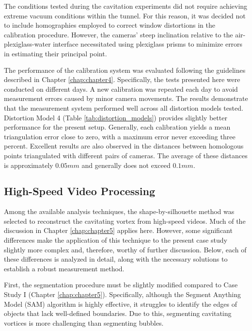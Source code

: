 The conditions tested during the cavitation experiments did not require achieving extreme vacuum conditions within the tunnel. For this reason, it was decided not to include homographies employed to correct window distortions in the calibration procedure.
However, the cameras' steep inclination relative to the air-plexiglass-water interface necessitated using plexiglass prisms to minimize errors in estimating their principal point.

The performance of the calibration system was evaluated following the guidelines described in Chapter \ref{chap:chapter4}. Specifically, the tests presented here were conducted on different days. A new calibration was repeated each day to avoid measurement errors caused by minor camera movements.
The results demonstrate that the measurement system performed well across all distortion models tested. Distortion Model 4 (Table \ref{tab:distortion_models}) provides slightly better performance for the present setup.
Generally, each calibration yields a mean triangulation error close to zero, with a maximum error never exceeding three percent. Excellent results are also observed in the distances between homologous points triangulated with different pairs of cameras. The average of these distances is approximately $0.05 mm$ and generally does not exceed $0.1 mm$.

\subsection{High-Speed Video Processing}
\label{sez:CVProc2}

Among the available analysis techniques, the shape-by-silhouette method was selected to reconstruct the cavitating vortex from high-speed videos.
Much of the discussion in Chapter \ref{chap:chapter5} applies here. However, some significant differences make the application of this technique to the present case study slightly more complex and, therefore, worthy of further discussion.
Below, each of these differences is analyzed in detail, along with the necessary solutions to establish a robust measurement method.

First, the segmentation procedure must be slightly modified compared to Case Study I (Chapter \ref{chap:chapter5}). Specifically, although the Segment Anything Model (SAM) algorithm is highly effective, it struggles to identify the edges of objects that lack well-defined boundaries.
Due to this, segmenting cavitating vortices is more challenging than segmenting bubbles.

